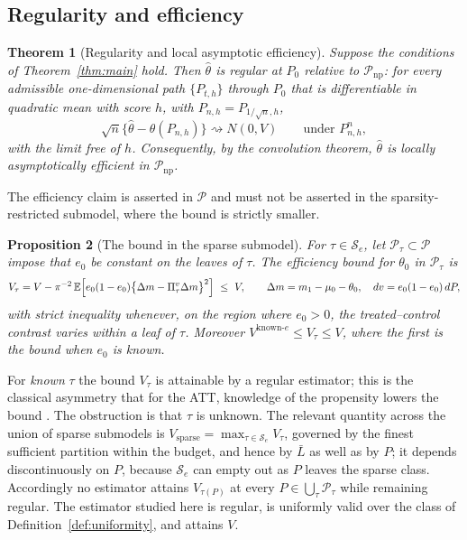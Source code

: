 \documentclass[11pt]{article}
\theoremstyle{plain}
\newtheorem{theorem}{Theorem}[section]
\newtheorem{proposition}[theorem]{Proposition}
\theoremstyle{definition}
\theoremstyle{remark}
\newcommand{\E}{\mathbb{E}}
\newcommand{\cS}{\mathcal{S}}
\newcommand{\cP}{\mathcal{P}}
\newcommand{\ez}{e_0}
\newcommand{\mz}{\mu_0}
\newcommand{\thetahat}{\widehat{\theta}}
\begin{document}
\subsection{Regularity and efficiency}\label{sec:regularity}

\begin{theorem}[Regularity and local asymptotic efficiency]\label{thm:regular}
Suppose the conditions of Theorem~\ref{thm:main} hold. Then $\thetahat$ is
regular at $P_0$ relative to $\cP_{\mathrm{np}}$: for every admissible
one-dimensional path $\{P_{t,h}\}$ through $P_0$ that is differentiable in
quadratic mean with score $h$, with $P_{n,h}=P_{1/\sqrt n,h}$,
\[
  \sqrt n\bigl\{\thetahat-\theta(P_{n,h})\bigr\}\rightsquigarrow N(0,V)
  \qquad\text{under }P_{n,h}^n,
\]
with the limit free of $h$. Consequently, by the convolution theorem,
$\thetahat$ is locally asymptotically efficient in $\cP_{\mathrm{np}}$.
\end{theorem}

The efficiency claim is asserted in $\cP$ and must not be asserted in the
sparsity-restricted submodel, where the bound is strictly smaller.

\begin{proposition}[The bound in the sparse submodel]\label{prop:sparse-bound}
For $\tau\in\cS_e$, let $\cP_\tau\subset\cP$ impose that $\ez$ be constant on
the leaves of $\tau$. The efficiency bound for $\theta_0$ in $\cP_\tau$ is
\[
  V_\tau=V-\pi^{-2}\,\E\Bigl[\ez(1-\ez)\bigl\{\Delta m
   -\Pi^{v}_\tau\Delta m\bigr\}^2\Bigr]\ \le\ V,
  \qquad \Delta m=m_1-\mz-\theta_0,\quad dv=\ez(1-\ez)\,dP,
\]
with strict inequality whenever, on the region where $\ez>0$, the
treated--control contrast varies within a
leaf of $\tau$. Moreover $V^{\mathrm{known}\text{-}e}\le V_\tau\le V$, where the
first is the bound when $\ez$ is known.
\end{proposition}

\noindent For \emph{known} $\tau$ the bound $V_\tau$ is attainable by a regular
estimator; this is the classical asymmetry that for the ATT, knowledge of the
propensity lowers the bound \citep{hahn1998}. The obstruction is that $\tau$ is
unknown. The relevant quantity across the union of sparse submodels is
$V_{\mathrm{sparse}}=\max_{\tau\in\cS_e}V_\tau$, governed by the finest
sufficient partition within the budget, and hence by $\bar L$ as well as by $P$;
it depends discontinuously on $P$, because $\cS_e$ can empty out as $P$ leaves
the sparse class. Accordingly no estimator attains $V_{\tau(P)}$ at every
$P\in\bigcup_\tau\cP_\tau$ while remaining regular. The estimator studied here
is regular, is uniformly valid over the class of
Definition~\ref{def:uniformity}, and attains $V$.
\end{document}
